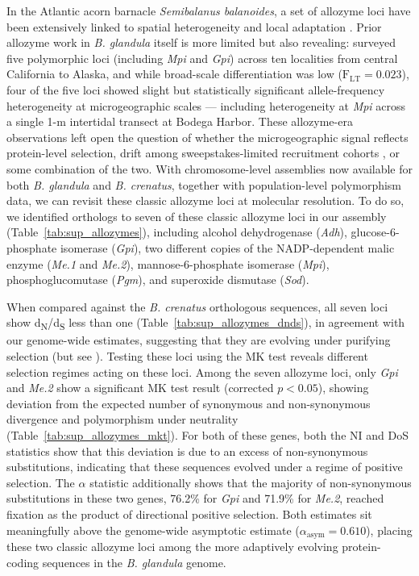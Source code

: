 \documentclass[11pt]{article}
\newcommand{\dnds}{d\textsubscript{N}/d\textsubscript{S}\xspace}
\newcommand{\bgla}{\textit{B. glandula}\xspace}
\begin{document}
In the Atlantic acorn barnacle \textit{Semibalanus balanoides}, a set of allozyme loci
have been extensively linked to spatial heterogeneity and local adaptation
\citep{flowerdew_electrophoretic_1983,nunez_footprints_2020,rand_ecological_2002,
schmidt_environmental_2000,flight_allozyme_2012,veliz_regional_2004}.
Prior allozyme work in \bgla{} itself is more limited but also revealing:
\cite{hedgecock_temporal_1994} surveyed five polymorphic loci (including
\textit{Mpi} and \textit{Gpi}) across ten localities from central California to
Alaska, and while broad-scale differentiation was low ($\text{F}_\text{LT} = 0.023$),
four of the five loci showed slight but statistically significant allele-frequency
heterogeneity at microgeographic scales --- including heterogeneity at \textit{Mpi}
across a single 1-m intertidal transect at Bodega Harbor.
These allozyme-era observations left open the question of whether the microgeographic
signal reflects protein-level selection, drift among sweepstakes-limited recruitment
cohorts \citep{hedgecock_does_1994}, or some combination of the two.
With chromosome-level assemblies now available for both \bgla{} and \textit{B. crenatus},
together with population-level polymorphism data, we can revisit these classic allozyme
loci at molecular resolution.
To do so, we identified orthologs to seven of these classic allozyme loci
in our assembly (Table~\ref{tab:sup_allozymes}), including
alcohol dehydrogenase (\textit{Adh}), glucose-6-phosphate isomerase (\textit{Gpi}), two
different copies of the NADP-dependent malic enzyme (\textit{Me.1} and \textit{Me.2}),
mannose-6-phosphate isomerase (\textit{Mpi}), phosphoglucomutase (\textit{Pgm}), and
superoxide dismutase (\textit{Sod}).
\vspace{0.2cm}

When compared against the \textit{B. crenatus} orthologous sequences, all seven loci show
\dnds{} less than one (Table~\ref{tab:sup_allozymes_dnds}), in agreement with our genome-wide
estimates, suggesting that they are evolving under purifying selection (but see
).
Testing these loci using the MK test reveals different selection regimes acting on these loci.
Among the seven allozyme loci, only \textit{Gpi} and \textit{Me.2} show a significant MK test
result (corrected $p < 0.05$), showing deviation from the expected number of synonymous and
non-synonymous divergence and polymorphism under neutrality
(Table~\ref{tab:sup_allozymes_mkt}).
For both of these genes, both the NI and DoS statistics show that this deviation is due to an
excess of non-synonymous substitutions, indicating that these sequences evolved under a
regime of positive selection.
The $\alpha$ statistic additionally shows that the majority of non-synonymous
substitutions in these two genes, 76.2\% for \textit{Gpi} and 71.9\% for \textit{Me.2},
reached fixation as the product of directional positive selection.
Both estimates sit meaningfully above the genome-wide asymptotic estimate
($\alpha_\text{asym} = 0.610$), placing these two classic allozyme loci among the more
adaptively evolving protein-coding sequences in the \bgla{} genome.
\vspace{0.2cm}
\end{document}
